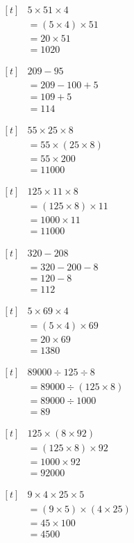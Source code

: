 \documentclass[UTF8]{ctexart}
\newcommand{\cell}[1]{%
  \begin{minipage}[t][49mm][t]{0.315\textwidth}%
    \vspace{0pt}%
    \linespread{1}\zihao{3}%
    #1%
  \end{minipage}%
}
\newcommand{\sheetrow}[3]{%
  \noindent\cell{#1}\hfill\cell{#2}\hfill\cell{#3}\par
  \nointerlineskip
}
\begin{document}
\sheetrow
{\(\begin{aligned}[t]
& 5\times 51\times 4 \\
& = (5\times 4)\times 51 \\
& = 20\times 51 \\
& = 1020
\end{aligned}\)}
{\(\begin{aligned}[t]
& 209-95 \\
& = 209-100+5 \\
& = 109+5 \\
& = 114
\end{aligned}\)}
{\(\begin{aligned}[t]
& 55\times 25\times 8 \\
& = 55\times (25\times 8) \\
& = 55\times 200 \\
& = 11000
\end{aligned}\)}
\sheetrow
{\(\begin{aligned}[t]
& 125\times 11\times 8 \\
& = (125\times 8)\times 11 \\
& = 1000\times 11 \\
& = 11000
\end{aligned}\)}
{\(\begin{aligned}[t]
& 320-208 \\
& = 320-200-8 \\
& = 120-8 \\
& = 112
\end{aligned}\)}
{\(\begin{aligned}[t]
& 5\times 69\times 4 \\
& = (5\times 4)\times 69 \\
& = 20\times 69 \\
& = 1380
\end{aligned}\)}
\sheetrow
{\(\begin{aligned}[t]
& 89000\div 125\div 8 \\
& = 89000\div (125\times 8) \\
& = 89000\div 1000 \\
& = 89
\end{aligned}\)}
{\(\begin{aligned}[t]
& 125\times (8\times 92) \\
& = (125\times 8)\times 92 \\
& = 1000\times 92 \\
& = 92000
\end{aligned}\)}
{\(\begin{aligned}[t]
& 9\times 4\times 25\times 5 \\
& = (9\times 5)\times (4\times 25) \\
& = 45\times 100 \\
& = 4500
\end{aligned}\)}
\end{document}
